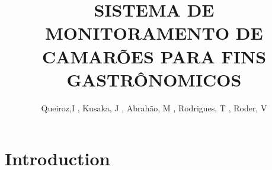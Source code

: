 \documentclass{article}
\title{SISTEMA DE MONITORAMENTO DE CAMARÕES PARA FINS GASTRÔNOMICOS}
\author{Queiroz,I\inst{${^1}$} , Kusaka, J\inst{${^2}$} , Abrahão, M\inst{${^3}$} , Rodrigues, T\inst{${^4}$} , Roder, V\inst{${^5}$}}
\date{}
\begin{document}
\maketitle

\section{Introduction}
\end{document}
